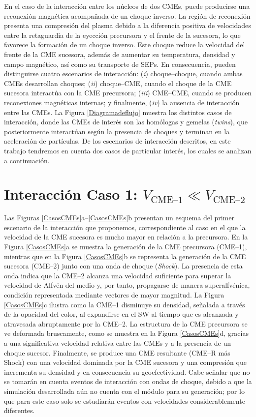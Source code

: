 En el caso de la interacción entre los núcleos de dos CMEs, puede producirse una reconexión magnética acompañada de un choque inverso. La región de reconexión presenta una compresión del plasma debido a la diferencia positiva de velocidades entre la retaguardia de la eyección precursora y el frente de la sucesora, lo que favorece la formación de un choque inverso. Este choque reduce la velocidad del frente de la CME sucesora, además de aumentar su temperatura, densidad y campo magnético, así como su transporte de \acp{SEP}. En consecuencia, pueden distinguirse cuatro escenarios de interacción: (\textit{i}) choque--choque, cuando ambas CMEs desarrollan choques; (\textit{ii}) choque--CME, cuando el choque de la CME sucesora interactúa con la CME precursora; (\textit{iii}) CME--CME, cuando se producen reconexiones magnéticas internas; y finalmente, (\textit{iv}) la ausencia de interacción entre las CMEs. La Figura \ref{Diagramadeflujo} muestra los distintos casos de interacción, donde las CMEs de interés son las homólogas y gemelas (\textit{twins}), que posteriormente interactúan según la presencia de choques y terminan en la aceleración de partículas. De los escenarios de interacción descritos, en este trabajo tendremos en cuenta dos casos de particular interés, los cuales se analizan a continuación.

\section{Interacción Caso 1: $V_{\text{CME--1}} \ll V_{\text{CME--2}}$}
\label{Caso1}
Las Figuras \ref{CasosCMEs}a--\ref{CasosCMEs}b presentan un esquema del primer escenario de la interacción que proponemos, correspondiente al caso en el que la velocidad de la CME sucesora es mucho mayor en relación a la precursora. En la Figura \ref{CasosCMEs}a se muestra la generación de la CME precursora (CME--1), mientras que en la Figura \ref{CasosCMEs}b se representa la generación de la CME sucesora (CME--2) junto con una onda de choque (\textit{Shock}). La presencia de esta onda indica que la CME--2 alcanza una velocidad suficiente para superar la velocidad de Alfvén del medio y, por tanto, propagarse de manera superalfvénica, condición representada mediante vectores de mayor magnitud. La Figura \ref{CasosCMEs}c ilustra como la CME--1 disminuye su densidad, señalada a través de la opacidad del color, al expandirse en el \ac{SW} al tiempo que es alcanzada y atravesada abruptamente por la CME--2. La estructura de la CME precursora se ve deformada bruscamente, como se muestra en la Figura \ref{CasosCMEs}d, gracias a una significativa velocidad relativa entre las CMEs y a la presencia de un choque sucesor. Finalmente, se produce una CME resultante (CME--R más Shock) con una velocidad dominada por la CME sucesora y una compresión que incrementa su densidad y en consecuencia su geoefectividad. Cabe señalar que no se tomarán en cuenta eventos de interacción con ondas de choque, debido a que la simulación desarrollada aún no cuenta con el módulo para su generación; por lo que para este caso solo se estudiarán eventos con velocidades considerablemente diferentes.

